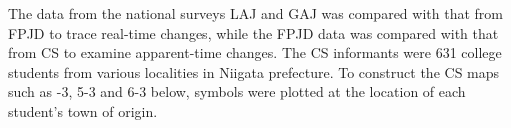 \documentclass[output=paper]{LSP/langsci}
\begin{document}
\begin{table}
\caption{A comparison of characteristics of four surveys}\label{tab:1}
\end{table}

The data from the national surveys LAJ and GAJ was compared with that from FPJD to trace real-time changes, while the FPJD data was compared with that from CS to examine apparent-time changes.  The CS informants were 631 college students from various localities in Niigata prefecture. To construct the CS maps such as -3, 5-3 and 6-3 below, symbols were plotted at the location of each student's town of origin.
\end{document}
